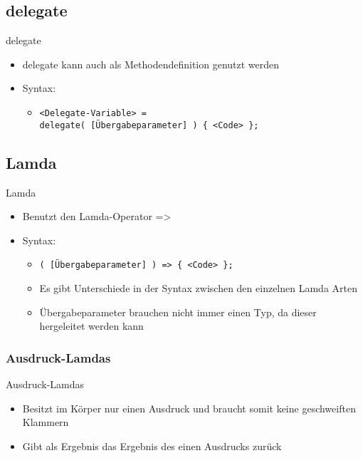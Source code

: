 \subsection{delegate}
\begin{frame}{delegate}
	\begin{itemize}
		\item \alert{delegate} kann auch als Methodendefinition genutzt werden
		\item Syntax:
		\begin{itemize}
			\item \texttt{\alert{<Delegate-Variable>} = \\delegate( \alert{[Übergabeparameter]} ) \{ \alert{<Code>} \};}
		\end{itemize}
	\end{itemize}
	
		
\end{frame}

\subsection{Lamda}
\begin{frame}{Lamda}
	\begin{itemize}
		\item Benutzt den Lamda-Operator \alert{=\textgreater}
		\item Syntax:
		\begin{itemize}
			\item \texttt{( \alert{[Übergabeparameter]} ) => \{ \alert{<Code>} \};}
			\item Es gibt Unterschiede in der Syntax zwischen den einzelnen Lamda Arten
			\item Übergabeparameter brauchen nicht immer einen Typ, da dieser hergeleitet werden kann
		\end{itemize}
	\end{itemize}
\end{frame}

\subsubsection{Ausdruck-Lamdas}
\begin{frame}{Ausdruck-Lamdas}
	\begin{itemize}
		\item Besitzt im Körper nur einen Ausdruck und braucht somit keine geschweiften Klammern
		\item Gibt als Ergebnis das Ergebnis des einen Ausdrucks zurück
	\end{itemize}
	
		
\end{frame}

